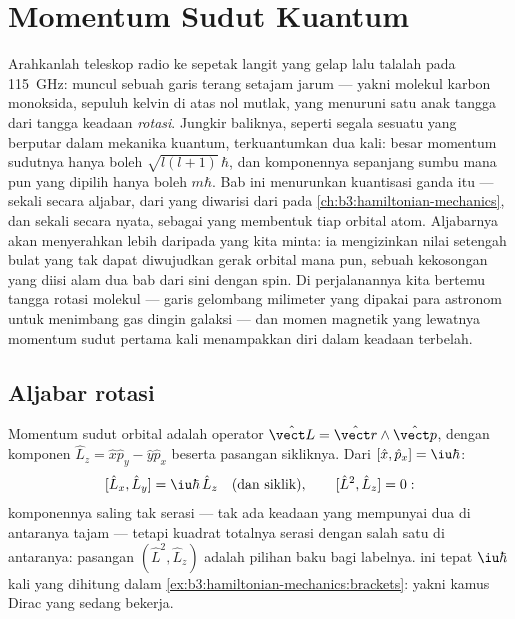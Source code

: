 \chapter{Momentum Sudut Kuantum}\label{ch:b3:quantum-angular-momentum}

Arahkanlah teleskop radio ke sepetak langit yang gelap lalu talalah pada
\qty{115}{GHz}: muncul sebuah garis terang setajam jarum --- yakni
molekul karbon monoksida, sepuluh kelvin di atas nol mutlak, yang
menuruni satu anak tangga dari tangga keadaan \emph{rotasi}. Jungkir
baliknya, seperti segala sesuatu yang berputar dalam mekanika kuantum,
terkuantumkan dua kali: besar momentum sudutnya hanya boleh
$\sqrt{l(l+1)}\,\hbar$, dan komponennya sepanjang sumbu mana pun yang
dipilih hanya boleh $m\hbar$. Bab ini menurunkan kuantisasi ganda itu ---
sekali secara aljabar, dari  yang diwarisi dari 
pada \cref{ch:b3:hamiltonian-mechanics}, dan sekali secara nyata,
sebagai  yang membentuk tiap orbital atom. Aljabarnya akan
menyerahkan lebih daripada yang kita minta: ia mengizinkan nilai
setengah bulat yang tak dapat diwujudkan gerak orbital mana pun, sebuah
kekosongan yang diisi alam dua bab dari sini dengan spin. Di
perjalanannya kita bertemu tangga rotasi molekul --- garis gelombang
milimeter yang dipakai para astronom untuk menimbang gas dingin galaksi
--- dan momen magnetik yang lewatnya momentum sudut pertama kali
menampakkan diri dalam keadaan terbelah.

\section{Aljabar rotasi}

\begin{definition}\label{def:b3:quantum-angular-momentum:operators}
Momentum sudut orbital adalah operator $\hat{\vect L} =
\hat{\vect r}\wedge\hat{\vect p}$, dengan komponen $\hat L_z = \hat
x\hat p_y - \hat y\hat p_x$ beserta pasangan sikliknya. Dari $[\hat x, \hat p_x] =
\iu\hbar$:
\[
[\hat L_x, \hat L_y] = \iu\hbar\,\hat L_z
\quad\text{(dan siklik)} , \qquad
[\hat L^2, \hat L_z] = 0 :
\]
komponennya saling tak serasi --- tak ada keadaan yang mempunyai dua di
antaranya tajam --- tetapi kuadrat totalnya serasi dengan salah satu di
antaranya: pasangan $(\hat L^2, \hat L_z)$ adalah pilihan baku bagi
labelnya.  ini tepat $\iu\hbar$ kali  yang
dihitung dalam \cref{ex:b3:hamiltonian-mechanics:brackets}: yakni kamus
Dirac yang sedang bekerja.
\end{definition}

